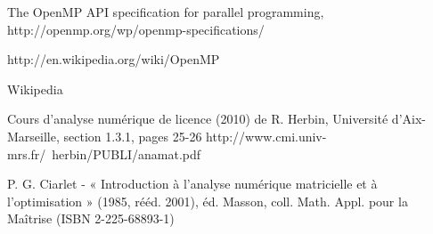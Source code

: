 \begin{thebibliography}{9}

  The OpenMP API specification for parallel programming,
  http://openmp.org/wp/openmp-specifications/

  http://en.wikipedia.org/wiki/OpenMP
  
  Wikipedia%

  Cours d'analyse numérique de licence (2010) de R. Herbin, Université d'Aix-Marseille, section 1.3.1, pages 25-26
  http://www.cmi.univ-mrs.fr/~herbin/PUBLI/anamat.pdf
  
  P. G. Ciarlet - « Introduction à l'analyse numérique matricielle et à l'optimisation » (1985, rééd. 2001), éd. Masson, coll. Math. Appl. pour la Maîtrise (ISBN 2-225-68893-1)

  

  
\end{thebibliography}
